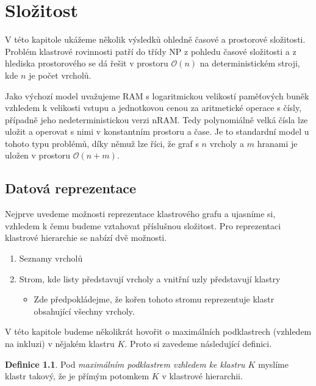 \documentclass[12pt,a4report]{report}
\theoremstyle{definition}
\newtheorem{defn}[theorem]{Definice}
\begin{document}
\author{Filip Šedivý}


\chapter{Složitost}
\label{slozitost}

V této kapitole ukážeme několik výsledků ohledně časové a prostorové složitosti.
Problém klastrové rovinnosti patří do třídy NP z pohledu časové složitosti a z hlediska prostorového se dá řešit v prostoru $\mathcal{O}(n)$ na deterministickém stroji, kde $n$ je počet vrcholů.

Jako výchozí model uvažujeme RAM s logaritmickou velikostí paměťových buněk vzhledem k velikosti vstupu a jednotkovou cenou za aritmetické operace s čísly, případně jeho nedeterministickou verzi nRAM. Tedy polynomiálně velká čísla lze uložit a operovat s nimi v konstantním prostoru a čase. Je to standardní model u tohoto typu problémů, díky němuž lze říci, že graf s $n$ vrcholy a $m$ hranami je uložen v prostoru $\mathcal O (n+m)$.

\section{Datová reprezentace}
Nejprve uvedeme možnosti reprezentace klastrového grafu a ujasníme si, vzhledem k čemu budeme vztahovat příslušnou složitost. 
Pro reprezentaci klastrové hierarchie se nabízí dvě možnosti.

\begin{enumerate}
\item Seznamy vrcholů
\item Strom, kde listy představují vrcholy a vnitřní uzly představují klastry
\begin{itemize}
\item Zde předpokládejme, že kořen tohoto stromu reprezentuje klastr obsahující všechny vrcholy.
\end{itemize}
\end{enumerate}

V této kapitole budeme několikrát hovořit o maximálních podklastrech (vzhledem na inkluzi) v nějakém klastru $K$. Proto si zavedeme následující definici.
\begin{defn}
Pod \textit{maximálním podklastrem vzhledem ke klastru $K$} myslíme klastr takový, že je přímým potomkem $K$ v klastrové hierarchii.
\end{defn}
\end{document}
